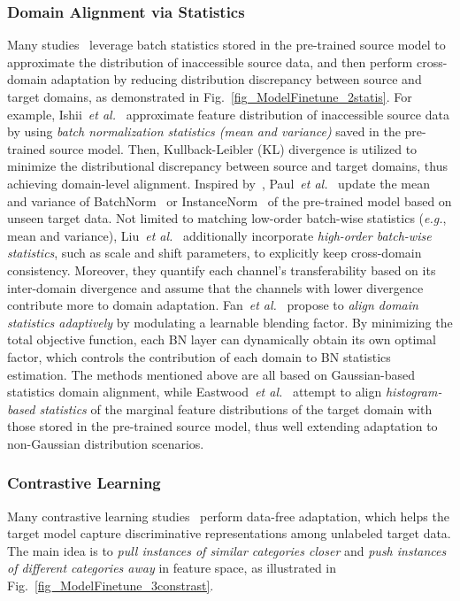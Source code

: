 \documentclass[10pt,journal,compsoc]{IEEEtran}
\def\etal{{\em et al.}}
\def\eg{{\em e.g.}}
\begin{document}
\subsubsection{Domain Alignment via Statistics}
Many studies~\cite{ishii2021source, liu2021adapting, paul2021unsupervised, fan2022unsupervised, eastwood2021source, zhang2021source, klingner2022unsupervised} leverage batch statistics stored in the pre-trained source model to approximate the distribution of inaccessible source data, and then perform cross-domain adaptation by reducing distribution discrepancy between source and target domains, as demonstrated in Fig.~\ref{fig_ModelFinetune_2statis}. 
For example, Ishii~\etal~\cite{ishii2021source} approximate feature distribution of inaccessible source data by using \emph{batch normalization statistics (mean and variance)} saved in the pre-trained source model.
Then, Kullback-Leibler (KL) divergence is utilized to minimize the distributional discrepancy between source and target domains, thus achieving domain-level alignment.
Inspired by~\cite{chang2019domain, li2016revisiting}, Paul~\etal~\cite{paul2021unsupervised} update the mean and variance of BatchNorm~\cite{ioffe2015batch} or InstanceNorm~\cite{ulyanov2016instance} of the pre-trained model based on unseen target data. 
Not limited to matching low-order batch-wise statistics (\eg, mean and variance), Liu~\etal~\cite{liu2021adapting} additionally incorporate \emph{high-order batch-wise statistics}, such as scale and shift parameters, to explicitly keep cross-domain consistency.
Moreover, they quantify each channel's transferability based on its inter-domain divergence and assume that the channels with lower divergence contribute more to domain adaptation.
Fan~\etal~\cite{fan2022unsupervised} propose to \emph{align domain statistics adaptively} by modulating a learnable blending factor.
By minimizing the total objective function, each BN layer can dynamically obtain its own optimal factor, which controls the contribution of each domain to BN statistics estimation.
The methods mentioned above are all based on Gaussian-based statistics domain alignment, while Eastwood~\etal~\cite{eastwood2021source} attempt to align \emph{histogram-based statistics} of the marginal feature distributions of the target domain with those stored in the pre-trained source model, thus well extending adaptation to non-Gaussian distribution scenarios.



\subsubsection{Contrastive Learning}
Many contrastive learning studies~\cite{xia2021adaptive, wang2022cross, huang2021model,agarwal2022unsupervised, zhao2022adaptive, liu2022sourceCon} perform data-free adaptation, %
which helps the target model capture discriminative representations among unlabeled target data.
The main idea is to \emph{pull instances of similar categories  closer} and \emph{push instances of different categories away} in feature space, as illustrated in Fig.~\ref{fig_ModelFinetune_3constrast}.
\end{document}
